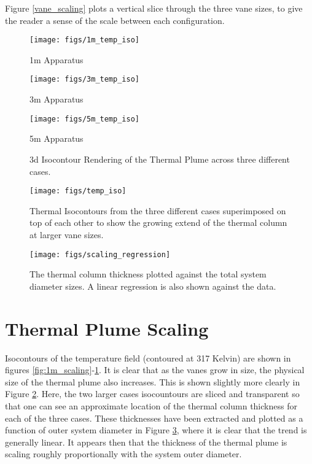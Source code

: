 \documentclass[english]{article}
\begin{document}
%
%
Figure \ref{vane_scaling} plots a vertical slice through the three vane sizes, to give the reader a sense of the 
scale between each configuration.

\begin{figure}[!htb]
  \texttt{[image: figs/1m\_temp\_iso]}
  \caption*{1m Apparatus}\label{fig:1m_scaling}
\endminipage\hfill
{}
  \texttt{[image: figs/3m\_temp\_iso]}
  \caption*{3m Apparatus}\label{fig:3m_scaling}
\endminipage\hfill
{}%
  \texttt{[image: figs/5m\_temp\_iso]}
  \caption*{5m Apparatus}\label{fig:5m_scaling}
\endminipage
\caption{3d Isocontour Rendering of the Thermal Plume across three different cases.}
\end{figure}


\begin{figure}[!htb]
  \begin{center}
    \texttt{[image: figs/temp\_iso]}
    \caption{Thermal Isocontours from the three different cases superimposed 
      on top of each other to show the growing extend of the thermal column at larger vane sizes. }
    \label{fig:scaling_slice}
  \end{center}
\end{figure}

\begin{figure}[!htb]
  \begin{center}
    \texttt{[image: figs/scaling\_regression]}
    \caption{The thermal column thickness plotted against the total system diameter sizes. A linear regression is also shown against the data.}
    \label{fig:scaling_reg}
  \end{center}
\end{figure}

\section*{Thermal Plume Scaling}
Isocontours of the temperature field (contoured at 317 Kelvin) are shown in figures \ref{fig:1m_scaling}-\ref{fig:5m_scaling}. 
It is clear that as the vanes grow in size, the physical size of the thermal plume also increases. This is shown slightly more clearly in
 Figure \ref{fig:scaling_slice}. Here, the two larger cases isocountours are sliced and transparent so that one can see an approximate 
location of the thermal column thickness for each of the three cases. These thicknesses have been extracted and plotted as a 
function of outer system diameter in Figure \ref{fig:scaling_reg}, where it is clear that the trend is generally linear. It appears then that 
the thickness of the thermal plume is scaling roughly proportionally with the system outer diameter. 
\end{document}
